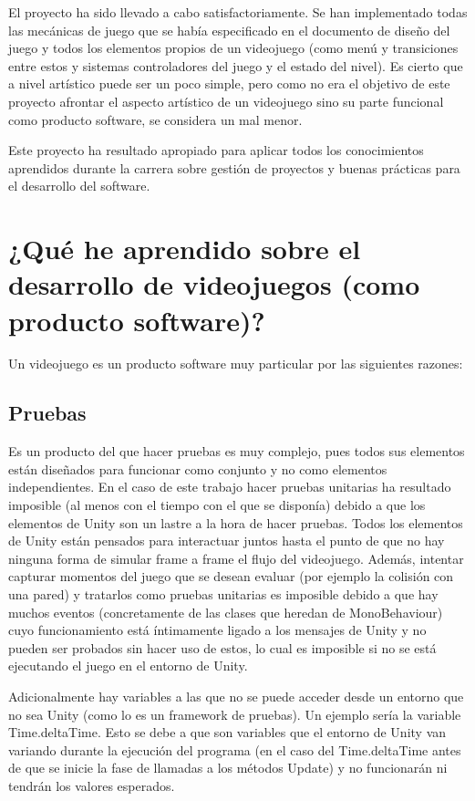
El proyecto ha sido llevado a cabo satisfactoriamente. Se han implementado todas las mecánicas de juego que se había especificado en el documento de diseño del juego y todos los elementos propios de un videojuego (como menú y transiciones entre estos y sistemas controladores del juego y el estado del nivel). Es cierto que a nivel artístico puede ser un poco simple, pero como no era el objetivo de este proyecto afrontar el aspecto artístico de un videojuego sino su parte funcional como producto software, se considera un mal menor.

Este proyecto ha resultado apropiado para aplicar todos los conocimientos aprendidos durante la carrera sobre gestión de proyectos y buenas prácticas para el desarrollo del software. 

\section{¿Qué he aprendido sobre el desarrollo de videojuegos (como producto software)?}
Un videojuego es un producto software muy particular por las siguientes razones:

\subsection{Pruebas}
Es un producto del que hacer pruebas es muy complejo, pues todos sus elementos están diseñados para funcionar como conjunto y no como elementos independientes. En el caso de este trabajo hacer pruebas unitarias ha resultado imposible (al menos con el tiempo con el que se disponía) debido a que los elementos de Unity son un lastre a la hora de hacer pruebas. Todos los elementos de Unity están pensados para interactuar juntos hasta el punto de que no hay ninguna forma de simular frame a frame el flujo del videojuego. Además, intentar capturar momentos del juego que se desean evaluar (por ejemplo la colisión con una pared) y tratarlos como pruebas unitarias es imposible debido a que hay muchos eventos (concretamente de las clases que heredan de MonoBehaviour) cuyo funcionamiento está íntimamente ligado a los mensajes de Unity y no pueden ser probados sin hacer uso de estos, lo cual es imposible si no se está ejecutando el juego en el entorno de Unity.

Adicionalmente hay variables a las que no se puede acceder desde un entorno que no sea Unity (como lo es un framework de pruebas). Un ejemplo sería la variable Time.deltaTime. Esto se debe a que son variables que el entorno de Unity van variando durante la ejecución del programa (en el caso del Time.deltaTime antes de que se inicie la fase de llamadas a los métodos Update) y no funcionarán ni tendrán los valores esperados.

